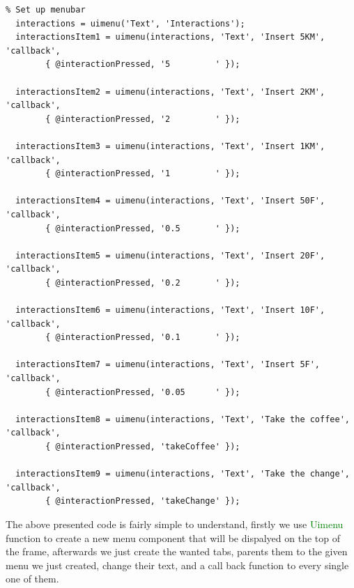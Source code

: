 \documentclass[a4paper, 10pt]{article}
\begin{document}
		\hline
		\begin{lstlisting}
% Set up menubar
  interactions = uimenu('Text', 'Interactions');
  interactionsItem1 = uimenu(interactions, 'Text', 'Insert 5KM', 'callback',
		{ @interactionPressed, '5         ' });

  interactionsItem2 = uimenu(interactions, 'Text', 'Insert 2KM', 'callback',
		{ @interactionPressed, '2         ' });

  interactionsItem3 = uimenu(interactions, 'Text', 'Insert 1KM', 'callback',
		{ @interactionPressed, '1         ' });

  interactionsItem4 = uimenu(interactions, 'Text', 'Insert 50F', 'callback',
		{ @interactionPressed, '0.5       ' });

  interactionsItem5 = uimenu(interactions, 'Text', 'Insert 20F', 'callback',
		{ @interactionPressed, '0.2       ' });

  interactionsItem6 = uimenu(interactions, 'Text', 'Insert 10F', 'callback',
		{ @interactionPressed, '0.1       ' });

  interactionsItem7 = uimenu(interactions, 'Text', 'Insert 5F', 'callback',
		{ @interactionPressed, '0.05      ' });

  interactionsItem8 = uimenu(interactions, 'Text', 'Take the coffee', 'callback',
		{ @interactionPressed, 'takeCoffee' });

  interactionsItem9 = uimenu(interactions, 'Text', 'Take the change', 'callback',
		{ @interactionPressed, 'takeChange' });
		\end{lstlisting}
		\noindent The above presented code is fairly simple to understand, firstly we use \textcolor{green}{Uimenu} function to create a new menu component that will be dispalyed on the top of the frame, afterwards we just create the wanted tabs, parents them
		to the given menu we just created, change their text, and a call back function to every single one of them.

		\pagebreak
\end{document}
